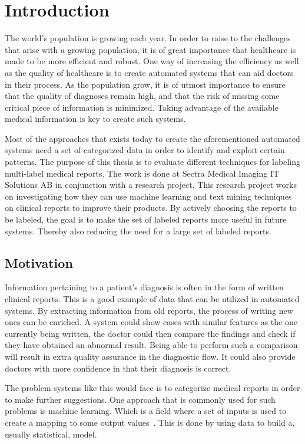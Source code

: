 \chapter{Introduction}
\label{cha:introduction}

The world's population is growing each year. 
In order to raise to the challenges that arise with a growing population, it is of great importance that healthcare is made to be more efficient and robust.
One way of increasing the efficiency as well as the quality of healthcare is to create automated systems that can aid doctors in their process.
As the population grow, it is of utmost importance to ensure that the quality of diagnoses remain high, and that the risk of missing some critical piece of information is minimized.
Taking advantage of the available medical information is key to create such systems.

Most of the approaches that exists today to create the aforementioned automated systems need a set of categorized data in order to identify and exploit certain patterns.
The purpose of this thesis is to evaluate different techniques for labeling multi-label medical reports.
The work is done at Sectra Medical Imaging IT Solutions AB in conjunction with a research project.
This research project works on investigating how they can use machine learning and text mining techniques on clinical reports to improve their products.
By actively choosing the reports to be labeled, the goal is to make the set of labeled reports more useful in future systems.
Thereby also reducing the need for a large set of labeled reports.

\section{Motivation}
\label{sec:motivation}

Information pertaining to a patient's diagnosis is often in the form of written clinical reports.
This is a good example of data that can be utilized in automated systems.
By extracting information from old reports, the process of writing new ones can be enriched.
A system could show cases with similar features as the one currently being written, the doctor could then compare the findings and check if they have obtained an abnormal result.
Being able to perform such a comparison will result in extra quality assurance in the diagnostic flow.
It could also provide doctors with more confidence in that their diagnosis is correct.

The problem systems like this would face is to categorize medical reports in order to make further suggestions.
One approach that is commonly used for such problems is machine learning.
Which is a field where a set of inputs is used to create a mapping to some output values~\cite{bishop2006pattern}.
This is done by using data to build a, usually statistical, model.

